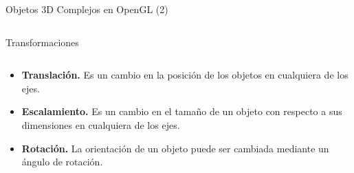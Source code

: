 \documentclass[aspectratio=169,compress]{beamer}
\begin{document}
\begin{frame}{Objetos 3D Complejos en OpenGL (2)}
\begin{columns}
\begin{column}{0.3\textwidth}
\begin{center}
\end{center}
\end{column}
\end{columns}


\end{frame}






\begin{frame}{Transformaciones}
\begin{columns}
\begin{column}{0.5\textwidth}
\begin{itemize}
\item \textbf{Translación.} Es un cambio en la posición de los objetos en cualquiera de los ejes.
\item \textbf{Escalamiento.} Es un cambio en el tamaño de un objeto con respecto a sus dimensiones en cualquiera de los ejes. 
\item \textbf{Rotación.} La orientación de un objeto puede ser cambiada mediante un ángulo de rotación.


\end{itemize}
\end{column}
\end{columns}
\end{frame}
\end{document}
